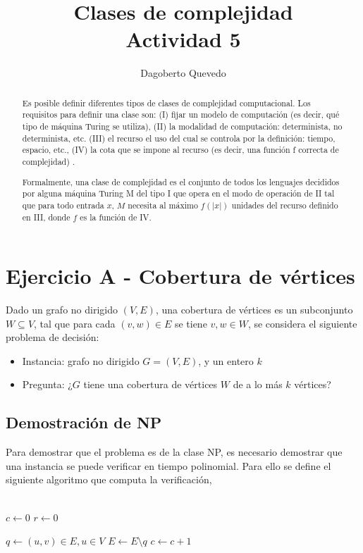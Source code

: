 \documentclass[letterpaper,11pt]{article}
\begin{document}
\title{Clases de complejidad\\\large Actividad 5}
\author{Dagoberto Quevedo}
\maketitle

\begin{abstract}

Es posible definir diferentes tipos de clases de complejidad computacional. Los requisitos para definir una clase son: (I) fijar un modelo de computación (es decir, qué tipo de máquina Turing se utiliza), (II) la modalidad de computación: determinista, no determinista, etc. (III) el recurso el uso del cual se controla por la definición: tiempo, espacio, etc., (IV) la cota que se impone al recurso (es decir, una función f correcta de complejidad) \cite{Schaeffer2020}.

Formalmente, una clase de complejidad es el conjunto de todos los lenguajes decididos por alguna máquina Turing M del tipo I que opera en el modo de operación de II tal que para todo entrada $x$, $M$ necesita al máximo $f(|x|)$ unidades del recurso definido en III, donde $f$ es la función de IV.

\end{abstract}


\section{Ejercicio A - Cobertura de vértices}

Dado un grafo no dirigido $(V,E)$, una cobertura de vértices es un subconjunto $W\subseteq V$, tal que para cada $(v,w)\in E$ se tiene $v,w\in W$, se considera el siguiente problema de decisión:
\begin{itemize}
\item Instancia: grafo no dirigido $G=(V,E)$, y un entero $k$
\item Pregunta: ¿$G$ tiene una cobertura de vértices $W$ de a lo más $k$ vértices? 
\end{itemize}

\subsection{Demostración de NP}

Para demostrar que el problema es de la clase NP, es necesario demostrar que una instancia se puede verificar en tiempo polinomial. Para ello se define el siguiente algoritmo que computa la verificación,
\\
\\
\begin{algorithmic}
\STATE $c\gets 0$
\STATE $r\gets 0$

	\STATE $q \gets {(u,v)\in E, u\in V }$
	\STATE $E \gets E\setminus q$
	\STATE $c \gets c + 1$
	\ENDIF
\ENDFOR
\end{algorithmic}
\end{document}
